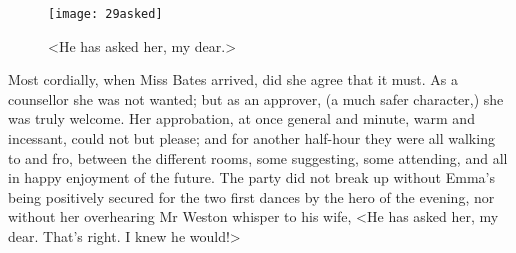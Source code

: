 \begin{figure}[tbph]
\centering
\texttt{[image: 29asked]}
\caption{<He has asked her, my dear.>}
\end{figure}

Most cordially, when Miss Bates arrived, did she agree that it must. As a counsellor she was not wanted; but as an approver, (a much safer character,) she was truly welcome. Her approbation, at once general and minute, warm and incessant, could not but please; and for another half-hour they were all walking to and fro, between the different rooms, some suggesting, some attending, and all in happy enjoyment of the future. The party did not break up without Emma's being positively secured for the two first dances by the hero of the evening, nor without her overhearing Mr Weston whisper to his wife, <He has asked her, my dear. That's right. I knew he would!>